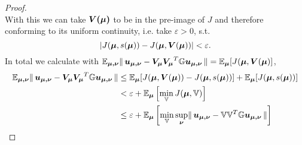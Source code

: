 \begin{proof}
\begin{equation*}
    \end{equation*}
    With this we can take $\boldsymbol{V(\mu)}$ to be in the pre-image of $J$ and therefore conforming to its uniform continuity, i.e. take $\varepsilon > 0$, s.t.
    \begin{equation*}
        \vert J(\boldsymbol{\mu}, s(\boldsymbol{\mu})) - J(\boldsymbol{\mu}, \boldsymbol{V}(\boldsymbol{\mu})) \vert < \varepsilon.
    \end{equation*}
    In total we calculate with $\mathbb{E}_{\boldsymbol{\mu, \nu}} \lVert \, \boldsymbol{u_{\mu, \nu}} - \boldsymbol{V_{\mu} V_{\mu}}^T \mathbb{G} \boldsymbol{u_{\mu, \nu}} \, \rVert = \mathbb{E}_{\boldsymbol{\mu}}[J(\boldsymbol{\mu}, \boldsymbol{V}(\boldsymbol{\mu})]$,
    \begin{align*}
        \mathbb{E}_{\boldsymbol{\mu, \nu}} \lVert \, \boldsymbol{u_{\mu, \nu}} - \boldsymbol{V_{\mu} V_{\mu}}^T \mathbb{G} \boldsymbol{u_{\mu, \nu}} \, \rVert &\leq \mathbb{E}_{\boldsymbol{\mu}}[J(\boldsymbol{\mu}, \boldsymbol{V}(\boldsymbol{\mu}))- J(\boldsymbol{\mu}, s(\boldsymbol{\mu}))] + \mathbb{E}_{\boldsymbol{\mu}}[J(\boldsymbol{\mu}, s(\boldsymbol{\mu}))] \\
        &< \varepsilon + \mathbb{E}_{\boldsymbol{\mu}} \left[ \min\limits_{\mathbb{V}} J(\boldsymbol{\mu}, \mathbb{V}) \right] \\
        &\leq \varepsilon + \mathbb{E}_{\boldsymbol{\mu}} \left[ \min\limits_{\mathbb{V}} \sup\limits_{\boldsymbol{\nu}} \lVert \, \boldsymbol{u_{\mu, \nu}} - \mathbb{V} \mathbb{V}^T \mathbb{G} \boldsymbol{u_{\mu, \nu}} \, \rVert \right]
    \end{align*}
\end{proof}

